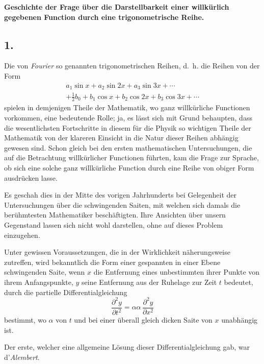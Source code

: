 \documentclass[12pt,a4paper]{book}
\theoremstyle{definition}
\theoremstyle{remark}
\begin{document}
\begin{center}
\textbf{Geschichte der Frage über die Darstellbarkeit einer willkürlich\\gegebenen Function durch eine trigonometrische Reihe.}
\end{center}

\subsection*{1.}

Die von \textit{Fourier} so genannten trigonometrischen Reihen, d.~h. die Reihen von der Form
\begin{multline*}
a_1\sin x + a_2\sin 2x + a_3\sin 3x + \cdots\\
+ \tfrac{1}{2}b_0 + b_1\cos x + b_2\cos 2x + b_3\cos 3x + \cdots
\end{multline*}
spielen in demjenigen Theile der Mathematik, wo ganz willkürliche Functionen vorkommen, eine bedeutende Rolle; ja, es lässt sich mit Grund behaupten, dass die wesentlichsten Fortschritte in diesem für die Physik so wichtigen Theile der Mathematik von der klareren Einsicht in die Natur dieser Reihen abhängig gewesen sind. Schon gleich bei den ersten mathematischen Untersuchungen, die auf die Betrachtung willkürlicher Functionen führten, kam die Frage zur Sprache, ob sich eine solche ganz willkürliche Function durch eine Reihe von obiger Form ausdrücken lasse.

Es geschah dies in der Mitte des vorigen Jahrhunderts bei Gelegenheit der Untersuchungen über die schwingenden Saiten, mit welchen sich damals die berühmtesten Mathematiker beschäftigten. Ihre Ansichten über unsern Gegenstand lassen sich nicht wohl darstellen, ohne auf dieses Problem einzugehen.

Unter gewissen Voraussetzungen, die in der Wirklichkeit näherungsweise zutreffen, wird bekanntlich die Form einer gespannten in einer Ebene schwingenden Saite, wenn $x$ die Entfernung eines unbestimmten ihrer Punkte von ihrem Anfangspunkte, $y$ seine Entfernung aus der Ruhelage zur Zeit $t$ bedeutet, durch die partielle Differentialgleichung
\[ \frac{\partial^2 y}{\partial t^2} = \alpha\alpha\,\frac{\partial^2 y}{\partial x^2} \]
bestimmt, wo $\alpha$ von $t$ und bei einer überall gleich dicken Saite von $x$ unabhängig ist.

Der erste, welcher eine allgemeine Lösung dieser Differentialgleichung gab, war d'\textit{Alembert}.
\end{document}
